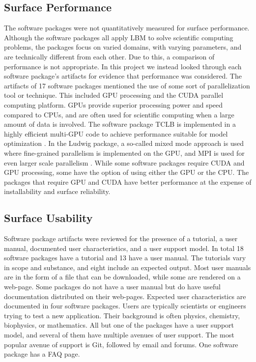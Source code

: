 \documentclass[12pt, notitlepage]{article}
\begin{document}
\subsection{Surface Performance}

The software packages were not quantitatively measured for surface performance.
Although the software packages all apply LBM to solve scientific computing problems, the packages focus on varied domains, with varying parameters, and are technically different from each other. Due to this, a comparison of performance is not appropriate. In this project we instead looked through each software package's artifacts for evidence that performance was considered. The artifacts of 17 software packages mentioned the use of some sort of parallelization tool or technique. This included GPU processing and the CUDA parallel computing platform. GPUs provide superior processing power and speed compared to CPUs, and are often used for scientific computing when a large amount of data is involved. The software package TCLB is implemented in a highly efficient multi-GPU code to achieve performance suitable for model optimization \citep{rutkowski2020open}. In the Ludwig package, a so-called mixed mode approach is used where fine-grained parallelism is implemented on the GPU, and MPI is used for even larger scale parallelism \citep{gray2013ludwig}. While some software packages require CUDA and GPU processing, some have the option of using either the GPU or the CPU. The packages that require GPU and CUDA have better performance at the expense of installability and surface reliability.

\subsection{Surface Usability}

Software package artifacts were reviewed for the presence of a tutorial, a user manual, documented user characteristics, and a user support model. In total 18 software packages have a tutorial and 13 have a user manual. The tutorials vary in scope and substance, and eight include an expected output. Most user manuals are in the form of a file that can be downloaded, while some are rendered on a web-page. Some packages do not have a user manual but do have useful documentation distributed on their web-pages. Expected user characteristics are documented in four software packages. Users are typically scientists or engineers trying to test a new application. Their background is often physics, chemistry, biophysics, or mathematics. All but one of the packages have a user support model, and several of them have multiple avenues of user support. The most popular avenue of support is Git, followed by email and forums. One software package has a FAQ page.    
\end{document}
